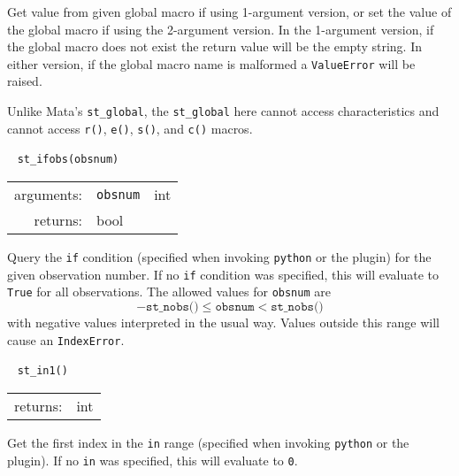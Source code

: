 \documentclass{article}
\begin{document}
			\vspace{1.5mm}
			\noindent Get value from given global macro if using 1-argument version, or set the value of the global macro if using the 2-argument version. In the 1-argument version, if the global macro does not exist the return value will be the empty string. In either version, if the global macro name is malformed a \lstinline{ValueError} will be raised. 
			
			Unlike Mata's \lstinline{st_global}, the \lstinline{st_global} here cannot access characteristics and cannot access \lstinline{r()}, \lstinline{e()}, \lstinline{s()}, and \lstinline{c()} macros. \newline
			
			
			\ \newline
			\noindent \lstinline$st_ifobs(obsnum)$
								
			\vspace{1.5mm}
			\noindent 
			\indent \begin{tabular}{rrl}
					arguments: & \texttt{obsnum} & int \\
					returns: & \multicolumn{2}{l}{bool}
				\end{tabular}
								
			\vspace{1.5mm}
			\noindent Query the \texttt{if} condition (specified when invoking \lstinline{python} or the plugin) for the given observation number. If no \texttt{if} condition was specified, this will evaluate to \texttt{True} for all observations. The allowed values for \lstinline{obsnum} are 
			\[
				-\texttt{st\_nobs()} \leq \texttt{obsnum} < \texttt{st\_nobs()}
			\]
			with negative values interpreted in the usual way. Values outside this range will cause an \lstinline{IndexError}.\newline
			
			
			\ \newline
			\noindent \lstinline$st_in1()$
								
			\vspace{1.5mm}
			\noindent 
			\indent \begin{tabular}{rl}
					returns: & int
				\end{tabular}
								
			\vspace{1.5mm}
			\noindent Get the first index in the \texttt{in} range (specified when invoking \lstinline{python} or the plugin). If no \texttt{in} was specified, this will evaluate to \texttt{0}. \newline
			
\end{document}

